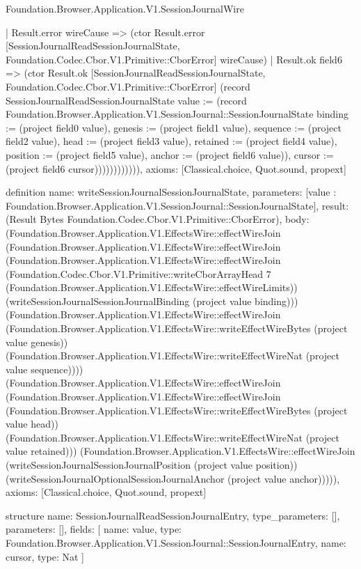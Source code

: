\begin{lexlean}{Foundation.Browser.Application.V1.SessionJournalWire}
\begin{semanticmodule}
{                    | Result.error wireCause => (ctor Result.error [SessionJournalReadSessionJournalState, Foundation.Codec.Cbor.V1.Primitive::CborError] wireCause)
                    | Result.ok field6 => (ctor Result.ok [SessionJournalReadSessionJournalState, Foundation.Codec.Cbor.V1.Primitive::CborError] (record SessionJournalReadSessionJournalState {value := (record Foundation.Browser.Application.V1.SessionJournal::SessionJournalState {binding := (project field0 value), genesis := (project field1 value), sequence := (project field2 value), head := (project field3 value), retained := (project field4 value), position := (project field5 value), anchor := (project field6 value)}), cursor := (project field6 cursor)}))))))))))),
  axioms: [Classical.choice, Quot.sound, propext]
}

definition{
  name: writeSessionJournalSessionJournalState,
  parameters: [value : Foundation.Browser.Application.V1.SessionJournal::SessionJournalState],
  result: (Result Bytes Foundation.Codec.Cbor.V1.Primitive::CborError),
  body: (Foundation.Browser.Application.V1.EffectsWire::effectWireJoin (Foundation.Browser.Application.V1.EffectsWire::effectWireJoin (Foundation.Browser.Application.V1.EffectsWire::effectWireJoin (Foundation.Codec.Cbor.V1.Primitive::writeCborArrayHead 7 (Foundation.Browser.Application.V1.EffectsWire::effectWireLimits)) (writeSessionJournalSessionJournalBinding (project value binding))) (Foundation.Browser.Application.V1.EffectsWire::effectWireJoin (Foundation.Browser.Application.V1.EffectsWire::writeEffectWireBytes (project value genesis)) (Foundation.Browser.Application.V1.EffectsWire::writeEffectWireNat (project value sequence)))) (Foundation.Browser.Application.V1.EffectsWire::effectWireJoin (Foundation.Browser.Application.V1.EffectsWire::effectWireJoin (Foundation.Browser.Application.V1.EffectsWire::writeEffectWireBytes (project value head)) (Foundation.Browser.Application.V1.EffectsWire::writeEffectWireNat (project value retained))) (Foundation.Browser.Application.V1.EffectsWire::effectWireJoin (writeSessionJournalSessionJournalPosition (project value position)) (writeSessionJournalOptionalSessionJournalAnchor (project value anchor))))),
  axioms: [Classical.choice, Quot.sound, propext]
}

structure{
  name: SessionJournalReadSessionJournalEntry,
  type_parameters: [],
  parameters: [],
  fields: [
    {name: value, type: Foundation.Browser.Application.V1.SessionJournal::SessionJournalEntry},
    {name: cursor, type: Nat}
  ]
}


\end{semanticmodule}
\end{lexlean}
